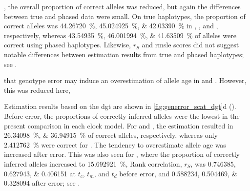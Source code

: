, the overall proportion of correct alleles was reduced, but again the differences between true and phased data were small.
On true haplotypes, the proportion of correct alleles was \SIlist{44.26720;45.024925;42.03390}{\percent} in \ClockM, \ClockR, and \ClockC, respectively, whereas \SIlist{43.54935;46.001994;41.63509}{\percent} of alleles were correct using phased haplotypes.
Likewise, $r_S$ and \gls{rmsle} scores did not suggest notable differences between estimation results from true and phased haplotypes; see .

 that genotype error may induce an overestimation of allele age in \ClockM and \ClockC.
However, this was reduced here,

%

%

Estimation results based on the \gls{dgt} are shown in \cref{fig:generror_scat_dgt}{d} ().
Before error, the proportions of correctly inferred alleles were the lowest in the present comparison in each clock model.
For \ClockM and \ClockC, the estimation resulted in \SIlist{26.34098;36.94915}{\percent} of correct alleles, respectively, whereas only \SI{2.412762}{\percent} were correct for \ClockR.
The tendency to overestimate allele age was increased after error.
This was also seen for \ClockR, where the proportion of correctly inferred alleles increased to \SI{15.692921}{\percent}, 
Rank correlation, $r_S$, was \numlist{0.746385;0.627943;0.406151} at $t_c$, $t_m$, and $t_d$ before error, and \numlist{0.588234;0.504469;0.328094} after error; see .

